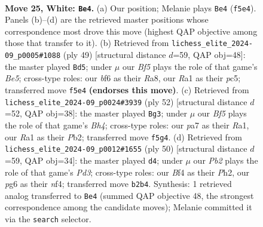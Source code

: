 \documentclass[11pt]{article}
\begin{document}
\clearpage

\begin{figure}[p]\centering
\begin{subfigure}{0.46\textwidth}\centering
\resizebox{\linewidth}{!}{%
\newchessgame
\chessboard[
  setfen={r4knr/p6p/2p2bp1/5B2/5B2/5P1P/PPP3P1/RR4K1 w - - 0 25},
  showmover=false,
  pgfstyle=straightmove, color=movearrow, markmove={f5-e4}
]}
\caption{}
\end{subfigure}\hfill
\begin{subfigure}{0.46\textwidth}\centering
\resizebox{\linewidth}{!}{%
\newchessgame
\chessboard[
  setfen={r2r2k1/5ppp/8/2P1p3/2Bpb3/5P2/P5PP/R3R1K1 b - - 0 25},
  showmover=false,
  pgfstyle=straightmove, color=movearrow, markmove={e4-d5}
]}
\caption{}
\end{subfigure}
\\[4pt]
\begin{subfigure}{0.46\textwidth}\centering
\resizebox{\linewidth}{!}{%
\newchessgame
\chessboard[
  setfen={3r2k1/1b2rp2/1b5p/2pP2p1/2B4B/7P/1P3PP1/R2R1K2 w - - 0 27},
  showmover=false,
  pgfstyle=straightmove, color=movearrow, markmove={h4-g3}
]}
\caption{}
\end{subfigure}\hfill
\begin{subfigure}{0.46\textwidth}\centering
\resizebox{\linewidth}{!}{%
\newchessgame
\chessboard[
  setfen={3r1r1k/ppp2p1p/8/4b1pB/1P2Pn2/P2P4/5P1P/2BR1R1K w - - 3 26},
  showmover=false,
  pgfstyle=straightmove, color=movearrow, markmove={d3-d4}
]}
\caption{}
\end{subfigure}
\caption{\textbf{Move 25, White: \texttt{Be4}.} (a) Our position; Melanie plays \texttt{Be4} (\texttt{f5e4}). Panels (b)--(d) are the retrieved master positions whose correspondence most drove this move (highest QAP objective among those that transfer to it). (b) Retrieved from \texttt{lichess\_elite\_2024-09\_p0005\#1088} (ply 49) [structural distance $d$=59, QAP obj=48]: the master played \texttt{Bd5}; under $\mu$ our \emph{Bf5} plays the role of that game's \emph{Be5}; cross-type roles: our \emph{b}f6 as their \emph{R}a8, our \emph{R}a1 as their \emph{p}c5; transferred move \texttt{f5e4} \textbf{(endorses this move)}. (c) Retrieved from \texttt{lichess\_elite\_2024-09\_p0024\#3939} (ply 52) [structural distance $d$=52, QAP obj=38]: the master played \texttt{Bg3}; under $\mu$ our \emph{Bf5} plays the role of that game's \emph{Bh4}; cross-type roles: our \emph{p}a7 as their \emph{R}a1, our \emph{R}a1 as their \emph{P}b2; transferred move \texttt{f5g4}. (d) Retrieved from \texttt{lichess\_elite\_2024-09\_p0012\#1655} (ply 50) [structural distance $d$=59, QAP obj=34]: the master played \texttt{d4}; under $\mu$ our \emph{Pb2} plays the role of that game's \emph{Pd3}; cross-type roles: our \emph{B}f4 as their \emph{P}h2, our \emph{p}g6 as their \emph{n}f4; transferred move \texttt{b2b4}. Synthesis: 1 retrieved analog transferred to \texttt{Be4} (summed QAP objective 48, the strongest correspondence among the candidate moves); Melanie committed it via the \texttt{search} selector.}
\label{fig:thought-m48}
\end{figure}
\end{document}
